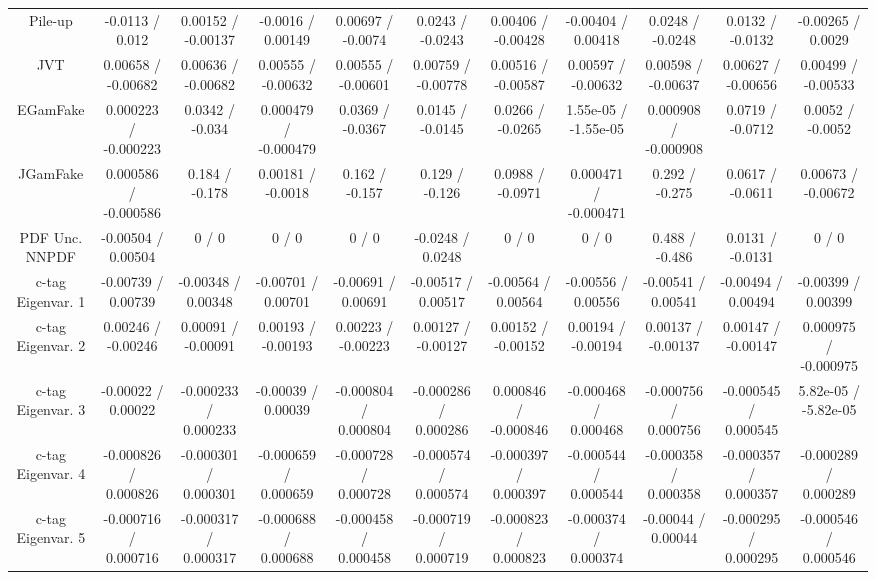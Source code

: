 \begin{table}[htbp]
\begin{center}
\begin{tabular}{|c|c|c|c|c|c|c|c|c|c|c|}
  Pile-up & -0.0113 / 0.012 & 0.00152 / -0.00137 & -0.0016 / 0.00149 & 0.00697 / -0.0074 & 0.0243 / -0.0243 & 0.00406 / -0.00428 & -0.00404 / 0.00418 & 0.0248 / -0.0248 & 0.0132 / -0.0132 & -0.00265 / 0.0029 \\ 
  JVT & 0.00658 / -0.00682 & 0.00636 / -0.00682 & 0.00555 / -0.00632 & 0.00555 / -0.00601 & 0.00759 / -0.00778 & 0.00516 / -0.00587 & 0.00597 / -0.00632 & 0.00598 / -0.00637 & 0.00627 / -0.00656 & 0.00499 / -0.00533 \\ 
  EGamFake & 0.000223 / -0.000223 & 0.0342 / -0.034 & 0.000479 / -0.000479 & 0.0369 / -0.0367 & 0.0145 / -0.0145 & 0.0266 / -0.0265 & 1.55e-05 / -1.55e-05 & 0.000908 / -0.000908 & 0.0719 / -0.0712 & 0.0052 / -0.0052 \\ 
  JGamFake & 0.000586 / -0.000586 & 0.184 / -0.178 & 0.00181 / -0.0018 & 0.162 / -0.157 & 0.129 / -0.126 & 0.0988 / -0.0971 & 0.000471 / -0.000471 & 0.292 / -0.275 & 0.0617 / -0.0611 & 0.00673 / -0.00672 \\ 
  PDF Unc. NNPDF & -0.00504 / 0.00504 & 0 / 0 & 0 / 0 & 0 / 0 & -0.0248 / 0.0248 & 0 / 0 & 0 / 0 & 0.488 / -0.486 & 0.0131 / -0.0131 & 0 / 0 \\ 
  c-tag Eigenvar. 1 & -0.00739 / 0.00739 & -0.00348 / 0.00348 & -0.00701 / 0.00701 & -0.00691 / 0.00691 & -0.00517 / 0.00517 & -0.00564 / 0.00564 & -0.00556 / 0.00556 & -0.00541 / 0.00541 & -0.00494 / 0.00494 & -0.00399 / 0.00399 \\ 
  c-tag Eigenvar. 2 & 0.00246 / -0.00246 & 0.00091 / -0.00091 & 0.00193 / -0.00193 & 0.00223 / -0.00223 & 0.00127 / -0.00127 & 0.00152 / -0.00152 & 0.00194 / -0.00194 & 0.00137 / -0.00137 & 0.00147 / -0.00147 & 0.000975 / -0.000975 \\ 
  c-tag Eigenvar. 3 & -0.00022 / 0.00022 & -0.000233 / 0.000233 & -0.00039 / 0.00039 & -0.000804 / 0.000804 & -0.000286 / 0.000286 & 0.000846 / -0.000846 & -0.000468 / 0.000468 & -0.000756 / 0.000756 & -0.000545 / 0.000545 & 5.82e-05 / -5.82e-05 \\ 
  c-tag Eigenvar. 4 & -0.000826 / 0.000826 & -0.000301 / 0.000301 & -0.000659 / 0.000659 & -0.000728 / 0.000728 & -0.000574 / 0.000574 & -0.000397 / 0.000397 & -0.000544 / 0.000544 & -0.000358 / 0.000358 & -0.000357 / 0.000357 & -0.000289 / 0.000289 \\ 
  c-tag Eigenvar. 5 & -0.000716 / 0.000716 & -0.000317 / 0.000317 & -0.000688 / 0.000688 & -0.000458 / 0.000458 & -0.000719 / 0.000719 & -0.000823 / 0.000823 & -0.000374 / 0.000374 & -0.00044 / 0.00044 & -0.000295 / 0.000295 & -0.000546 / 0.000546 \\ 

\end{tabular}
\end{center}
\end{table}
